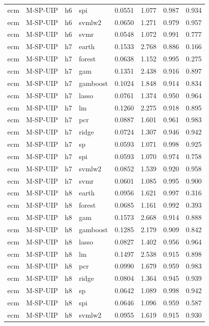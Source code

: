 \begin{ThreePartTable}
\begin{longtable}[t]{llclcccc}
ecm & M-SP-UIP & h6 & spi & 0.0551 & 1.077 & 0.987 & 0.934\\
ecm & M-SP-UIP & h6 & svmlw2 & 0.0650 & 1.271 & 0.979 & 0.957\\
ecm & M-SP-UIP & h6 & svmr & 0.0548 & 1.072 & 0.991 & 0.777\\
\addlinespace
ecm & M-SP-UIP & h7 & earth & 0.1533 & 2.768 & 0.886 & 0.166\\
ecm & M-SP-UIP & h7 & forest & 0.0638 & 1.152 & 0.995 & 0.275\\
ecm & M-SP-UIP & h7 & gam & 0.1351 & 2.438 & 0.916 & 0.897\\
ecm & M-SP-UIP & h7 & gamboost & 0.1024 & 1.848 & 0.914 & 0.834\\
ecm & M-SP-UIP & h7 & lasso & 0.0761 & 1.374 & 0.950 & 0.964\\
ecm & M-SP-UIP & h7 & lm & 0.1260 & 2.275 & 0.918 & 0.895\\
ecm & M-SP-UIP & h7 & pcr & 0.0887 & 1.601 & 0.961 & 0.983\\
ecm & M-SP-UIP & h7 & ridge & 0.0724 & 1.307 & 0.946 & 0.942\\
ecm & M-SP-UIP & h7 & sp & 0.0593 & 1.071 & 0.998 & 0.925\\
ecm & M-SP-UIP & h7 & spi & 0.0593 & 1.070 & 0.974 & 0.758\\
ecm & M-SP-UIP & h7 & svmlw2 & 0.0852 & 1.539 & 0.920 & 0.958\\
ecm & M-SP-UIP & h7 & svmr & 0.0601 & 1.085 & 0.995 & 0.900\\
\addlinespace
ecm & M-SP-UIP & h8 & earth & 0.0956 & 1.621 & 0.997 & 0.316\\
ecm & M-SP-UIP & h8 & forest & 0.0685 & 1.161 & 0.992 & 0.393\\
ecm & M-SP-UIP & h8 & gam & 0.1573 & 2.668 & 0.914 & 0.888\\
ecm & M-SP-UIP & h8 & gamboost & 0.1285 & 2.179 & 0.909 & 0.842\\
ecm & M-SP-UIP & h8 & lasso & 0.0827 & 1.402 & 0.956 & 0.964\\
ecm & M-SP-UIP & h8 & lm & 0.1497 & 2.538 & 0.915 & 0.898\\
ecm & M-SP-UIP & h8 & pcr & 0.0990 & 1.679 & 0.959 & 0.983\\
ecm & M-SP-UIP & h8 & ridge & 0.0804 & 1.364 & 0.945 & 0.939\\
ecm & M-SP-UIP & h8 & sp & 0.0642 & 1.089 & 0.998 & 0.942\\
ecm & M-SP-UIP & h8 & spi & 0.0646 & 1.096 & 0.959 & 0.587\\
ecm & M-SP-UIP & h8 & svmlw2 & 0.0955 & 1.619 & 0.915 & 0.930\\

\end{longtable}
\end{ThreePartTable}
